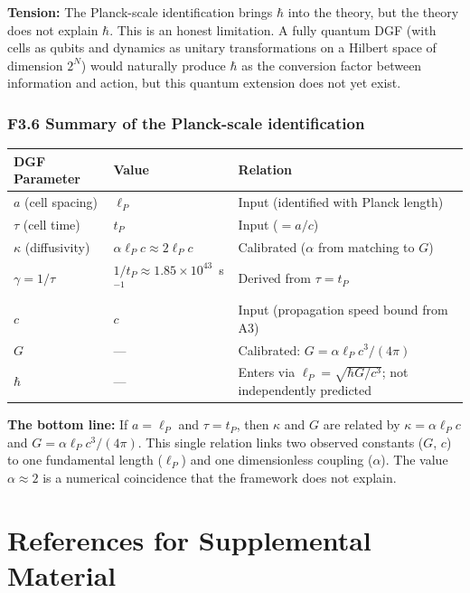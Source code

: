 \documentclass[reprint]{revtex4-2}
\begin{document}
\textbf{Tension:} The Planck-scale identification brings $\hbar$ into the theory, but the theory does not explain $\hbar$. This is an honest limitation. A fully quantum DGF (with cells as qubits and dynamics as unitary transformations on a Hilbert space of dimension $2^N$) would naturally produce $\hbar$ as the conversion factor between information and action, but this quantum extension does not yet exist.

\subsubsection{F3.6 Summary of the Planck-scale identification}

\begin{center}
\begin{tabular}{lll}
\toprule
DGF Parameter & Value & Relation \\
\midrule
$a$ (cell spacing) & $\ell_P$ & Input (identified with Planck length) \\
$\tau$ (cell time) & $t_P$ & Input ($=a/c$) \\
$\kappa$ (diffusivity) & $\alpha\ell_P c \approx 2\ell_P c$ & Calibrated ($\alpha$ from matching to $G$) \\
$\gamma = 1/\tau$ & $1/t_P \approx 1.85\times 10^{43}$~s$^{-1}$ & Derived from $\tau = t_P$ \\
$c$ & $c$ & Input (propagation speed bound from A3) \\
$G$ & --- & Calibrated: $G = \alpha\ell_P c^3/(4\pi)$ \\
$\hbar$ & --- & Enters via $\ell_P = \sqrt{\hbar G/c^3}$; not independently predicted \\
\bottomrule
\end{tabular}
\end{center}

\textbf{The bottom line:} If $a=\ell_P$ and $\tau=t_P$, then $\kappa$ and $G$ are related by $\kappa = \alpha\ell_P c$ and $G = \alpha\ell_P c^3/(4\pi)$. This single relation links two observed constants ($G$, $c$) to one fundamental length ($\ell_P$) and one dimensionless coupling ($\alpha$). The value $\alpha \approx 2$ is a numerical coincidence that the framework does not explain.

\section*{References for Supplemental Material}
\end{document}
